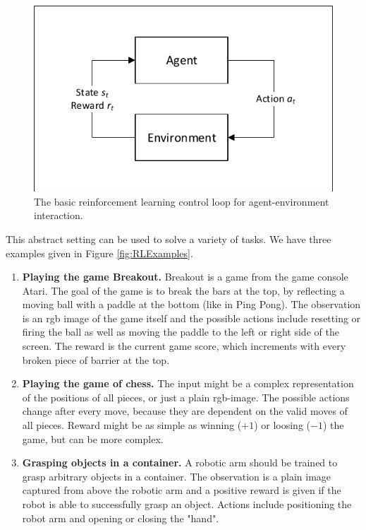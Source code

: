 \begin{figure}[ht]
    
  \begin{center}
      \includegraphics[clip, trim=10px 10px 10px 10px, width=0.6\columnwidth]{figures/rl/rl_control_loop.pdf}
  \end{center}
  
  \caption[Agent-environment interaction control loop]{The basic reinforcement learning control loop for agent-environment interaction.}
  \label{fig:rl_control_loop}
\end{figure}

This abstract setting can be used to solve a variety of tasks. We have three examples given in Figure \ref{fig:RLExamples}.
\begin{enumerate}
  \item \textbf{Playing the game Breakout.} Breakout is a game from the game console Atari. The goal of the game is to break the bars at the top, by reflecting a moving ball with a paddle at the bottom (like in Ping Pong). The observation is an rgb image of the game itself and the possible actions include resetting or firing the ball as well as moving the paddle to the left or right side of the screen. The reward is the current game score, which increments with every broken piece of barrier at the top. 
  \item \textbf{Playing the game of chess.} The input might be a complex representation of the positions of all pieces, or just a plain rgb-image. The possible actions change after every move, because they are dependent on the valid moves of all pieces. Reward might be as simple as winning ($+1$) or loosing ($-1$) the game, but can be more complex.
  \item \textbf{Grasping objects in a container.} A robotic arm should be trained to grasp arbitrary objects in a container. The observation is a plain image captured from above the robotic arm and a positive reward is given if the robot is able to successfully grasp an object. Actions include positioning the robot arm and opening or closing the "hand". 
\end{enumerate}

